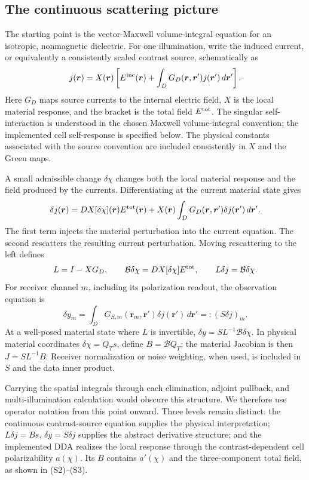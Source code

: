 \subsection*{The continuous scattering picture}
The starting point is the vector-Maxwell volume-integral equation for an isotropic, nonmagnetic dielectric. For one illumination, write the induced current, or equivalently a consistently scaled contrast source, schematically as
\[
j(\boldsymbol r)=X(\boldsymbol r)\left[E^{\rm inc}(\boldsymbol r)
+\int_D G_D(\boldsymbol r,\boldsymbol r')j(\boldsymbol r')\,d\boldsymbol r'\right].
\]
Here $G_D$ maps source currents to the internal electric field, $X$ is the local material response, and the bracket is the total field $E^{\rm tot}$. The singular self-interaction is understood in the chosen Maxwell volume-integral convention; the implemented cell self-response is specified below. The physical constants associated with the source convention are included consistently in $X$ and the Green maps.

A small admissible change $\delta\chi$ changes both the local material response and the field produced by the currents. Differentiating at the current material state gives
\[
\delta j(\boldsymbol r)=DX[\delta\chi](\boldsymbol r)E^{\rm tot}(\boldsymbol r)
+X(\boldsymbol r)\int_DG_D(\boldsymbol r,\boldsymbol r')\delta j(\boldsymbol r')\,d\boldsymbol r'.
\]
The first term injects the material perturbation into the current equation. The second rescatters the resulting current perturbation. Moving rescattering to the left defines
\[
L=I-XG_D,\qquad \mathcal B\delta\chi=DX[\delta\chi]E^{\rm tot},
\qquad L\delta j=\mathcal B\delta\chi.
\]
For receiver channel $m$, including its polarization readout, the observation equation is
\[
\delta y_m=\int_DG_{S,m}(\boldsymbol r_m,\boldsymbol r')\delta j(\boldsymbol r')\,d\boldsymbol r'
=:(S\delta j)_m.
\]
At a well-posed material state where $L$ is invertible, $\delta y=SL^{-1}\mathcal B\delta\chi$. In physical material coordinates $\delta\chi=Q_Ts$, define $B=\mathcal BQ_T$; the material Jacobian is then $J=SL^{-1}B$. Receiver normalization or noise weighting, when used, is included in $S$ and the data inner product.

Carrying the spatial integrals through each elimination, adjoint pullback, and multi-illumination calculation would obscure this structure. We therefore use operator notation from this point onward. Three levels remain distinct: the continuous contrast-source equation supplies the physical interpretation; $L\delta j=Bs$, $\delta y=S\delta j$ supplies the abstract derivative structure; and the implemented DDA realizes the local response through the contrast-dependent cell polarizability $a(\chi)$. Its $B$ contains $a'(\chi)$ and the three-component total field, as shown in (S2)--(S3).

